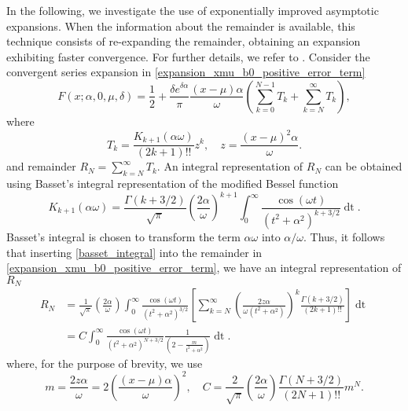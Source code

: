 \documentclass[10pt,a4paper,oneside]{article}
\numberwithin{equation}{section}
\begin{document}
In the following, we investigate the use of exponentially improved asymptotic expansions. When the information about the remainder is available, this technique consists of re-expanding the remainder, obtaining an expansion exhibiting faster convergence. For further details, we refer to \cite[\S 14]{Olver1997}. Consider the convergent series expansion in \eqref{expansion_xmu_b0_positive_error_term}
\begin{equation}
F(x;\alpha, 0, \mu, \delta) = \frac{1}{2} + \frac{\delta e^{\delta \alpha}}{\pi} \frac{(x-\mu)\alpha}{\omega} \left(\sum_{k=0}^{N-1} T_k + \sum_{k=N}^{\infty} T_k\right),
\end{equation}
where
\begin{equation}
T_k = \frac{K_{k+1}(\alpha\omega)}{(2k + 1)!!} z^k, \quad z = \frac{(x-\mu)^2 \alpha}{\omega}.
\end{equation}
and remainder $R_N = \sum_{k=N}^{\infty} T_k$. An integral representation of $R_N$ can be obtained using Basset's integral \cite[\S 10.32.11]{NIST:DLMF} representation of the modified Bessel function
\begin{equation}\label{basset_integral}
K_{k+1}(\alpha\omega) = \frac{\Gamma(k + 3/2)}{\sqrt{\pi}}\left(\frac{2\alpha}{\omega}\right)^{k+1} \int_0^{\infty} \frac{\cos(\omega t)}{(t^2 + \alpha^2)^{k + 3/2}} \mathop{dt}.
\end{equation}
Basset's integral is chosen to transform the term $\alpha\omega$ into $\alpha/\omega$. Thus, it follows that inserting \eqref{basset_integral} into the remainder in \eqref{expansion_xmu_b0_positive_error_term}, we have an integral representation of $R_N$
\begin{align}\label{convergent_remainder_integral}
R_N &= \frac{1}{\sqrt{\pi}} \left(\frac{2\alpha}{\omega}\right) \int_0^{\infty} \frac{\cos(\omega t)}{(t^2 + \alpha^2)^{3/2}} \left[\sum_{k=N}^{\infty} \left(\frac{2z\alpha}{\omega (t^2 + \alpha^2)}\right)^k \frac{\Gamma(k + 3/2)}{(2k + 1)!!}\right] \mathop{dt}\nonumber\\
&= C \int_0^{\infty} \frac{\cos(\omega t)}{(t^2 + \alpha^2)^{N + 3/2}} \frac{1}{\left(2 - \frac{m}{t^2+ \alpha^2}\right)} \mathop{dt}.
\end{align}
where, for the purpose of brevity, we use
\begin{equation}
m = \frac{2z\alpha}{\omega} = 2\left(\frac{(x-\mu)\alpha}{\omega}\right)^2,  \quad C = \frac{2}{\sqrt{\pi}} \left(\frac{2\alpha}{\omega}\right)\frac{\Gamma(N + 3/2)}{(2N + 1)!!} m^N.
\end{equation}
\end{document}

